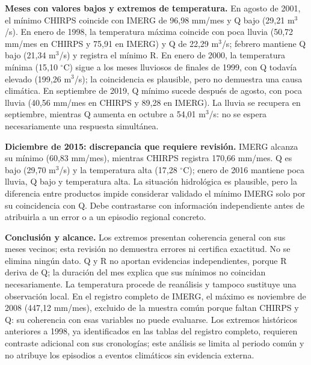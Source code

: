 \textbf{Meses con valores bajos y extremos de temperatura.} En agosto de 2001, el mínimo CHIRPS coincide con IMERG de 96,98 mm/mes y Q bajo (29,21 m$^3$/s). En enero de 1998, la temperatura máxima coincide con poca lluvia (50,72 mm/mes en CHIRPS y 75,91 en IMERG) y Q de 22,29 m$^3$/s; febrero mantiene Q bajo (21,34 m$^3$/s) y registra el mínimo R. En enero de 2000, la temperatura mínima (15,10 $^\circ$C) sigue a los meses lluviosos de finales de 1999, con Q todavía elevado (199,26 m$^3$/s); la coincidencia es plausible, pero no demuestra una causa climática. En septiembre de 2019, Q mínimo sucede después de agosto, con poca lluvia (40,56 mm/mes en CHIRPS y 89,28 en IMERG). La lluvia se recupera en septiembre, mientras Q aumenta en octubre a 54,01 m$^3$/s: no se espera necesariamente una respuesta simultánea.

\textbf{Diciembre de 2015: discrepancia que requiere revisión.} IMERG alcanza su mínimo (60,83 mm/mes), mientras CHIRPS registra 170,66 mm/mes. Q es bajo (29,70 m$^3$/s) y la temperatura alta (17,28 $^\circ$C); enero de 2016 mantiene poca lluvia, Q bajo y temperatura alta. La situación hidrológica es plausible, pero la diferencia entre productos impide considerar validado el mínimo IMERG solo por su coincidencia con Q. Debe contrastarse con información independiente antes de atribuirla a un error o a un episodio regional concreto.

\textbf{Conclusión y alcance.} Los extremos presentan coherencia general con sus meses vecinos; esta revisión no demuestra errores ni certifica exactitud. No se elimina ningún dato. Q y R no aportan evidencias independientes, porque R deriva de Q; la duración del mes explica que sus mínimos no coincidan necesariamente. La temperatura procede de reanálisis y tampoco sustituye una observación local. En el registro completo de IMERG, el máximo es noviembre de 2008 (447,12 mm/mes), excluido de la muestra común porque faltan CHIRPS y Q: su coherencia con esas variables no puede evaluarse. Los extremos históricos anteriores a 1998, ya identificados en las tablas del registro completo, requieren contraste adicional con sus cronologías; este análisis se limita al periodo común y no atribuye los episodios a eventos climáticos sin evidencia externa.

